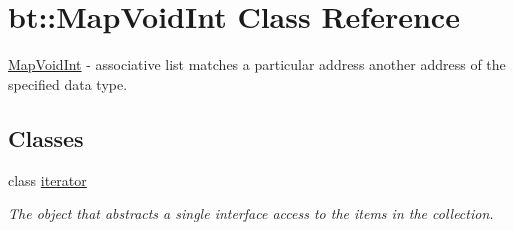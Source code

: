 \hypertarget{classbt_1_1_map_void_int}{\section{bt\-:\-:Map\-Void\-Int Class Reference}
\label{classbt_1_1_map_void_int}
}


\hyperlink{classbt_1_1_map_void_int}{Map\-Void\-Int} -\/ associative list matches a particular address another address of the specified data type.  


\subsection*{Classes}
\begin{DoxyCompactItemize}
\item 
class \hyperlink{classbt_1_1_map_void_int_1_1iterator}{iterator}
\begin{DoxyCompactList}\small\item\em The object that abstracts a single interface access to the items in the collection. \end{DoxyCompactList}\end{DoxyCompactItemize}
